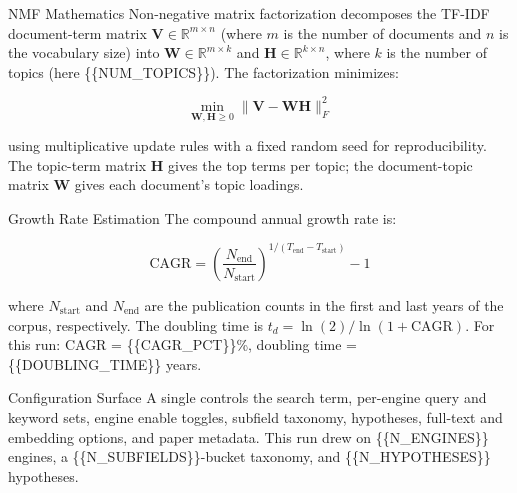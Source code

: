 \documentclass[
  ignorenonframetext,
]{beamer}
\begin{document}
\begin{frame}[allowframebreaks]{NMF Mathematics}
\label{nmf-mathematics}
Non-negative matrix factorization decomposes the TF-IDF document-term
matrix \(\mathbf{V} \in \mathbb{R}^{m \times n}\) (where \(m\) is the
number of documents and \(n\) is the vocabulary size) into
\(\mathbf{W} \in \mathbb{R}^{m \times k}\) and
\(\mathbf{H} \in \mathbb{R}^{k \times n}\), where \(k\) is the number of
topics (here \{\{NUM\_TOPICS\}\}). The factorization minimizes:

\[
\min_{\mathbf{W}, \mathbf{H} \geq 0} \|\mathbf{V} - \mathbf{W} \mathbf{H}\|_F^2
\]

using multiplicative update rules  with a fixed
random seed for reproducibility. The topic-term matrix \(\mathbf{H}\)
gives the top terms per topic; the document-topic matrix \(\mathbf{W}\)
gives each document's topic loadings.
\end{frame}

\begin{frame}[allowframebreaks]{Growth Rate Estimation}
\label{growth-rate-estimation}
The compound annual growth rate is:

\[
\text{CAGR} = \left(\frac{N_{\text{end}}}{N_{\text{start}}}\right)^{1/(T_{\text{end}} - T_{\text{start}})} - 1
\]

where \(N_{\text{start}}\) and \(N_{\text{end}}\) are the publication
counts in the first and last years of the corpus, respectively. The
doubling time is \(t_d = \ln(2) / \ln(1 + \text{CAGR})\). For this run:
CAGR = \{\{CAGR\_PCT\}\}\%, doubling time = \{\{DOUBLING\_TIME\}\}
years.
\end{frame}

\begin{frame}{Configuration Surface}
\label{configuration-surface}
A single  controls the search term,
per-engine query and keyword sets, engine enable toggles, subfield
taxonomy, hypotheses, full-text and embedding options, and paper
metadata. This run drew on \{\{N\_ENGINES\}\} engines, a
\{\{N\_SUBFIELDS\}\}-bucket taxonomy, and \{\{N\_HYPOTHESES\}\}
hypotheses.
\end{frame}
\end{document}
